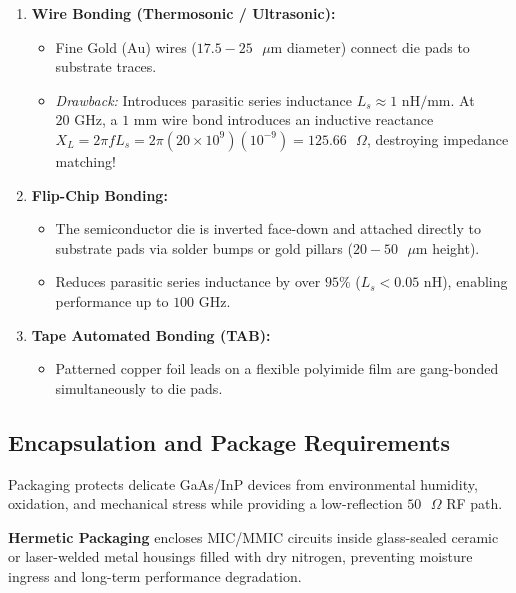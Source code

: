 \documentclass[10pt,a4paper]{article}
\begin{document}
\begin{enumerate}[leftmargin=*, itemsep=5pt]
  \item \textbf{Wire Bonding (Thermosonic / Ultrasonic):}
    \begin{itemize}[leftmargin=*, noitemsep]
      \item Fine Gold ($\text{Au}$) wires ($17.5 - 25\text{ }\mu\text{m}$ diameter) connect die pads to substrate traces.
      \item \textit{Drawback:} Introduces parasitic series inductance $L_s \approx 1\text{ nH/mm}$. At $20\text{ GHz}$, a $1\text{ mm}$ wire bond introduces an inductive reactance $X_L = 2\pi f L_s = 2\pi (20 \times 10^9) (10^{-9}) = 125.66\text{ }\Omega$, destroying impedance matching!
    \end{itemize}
  \item \textbf{Flip-Chip Bonding:}
    \begin{itemize}[leftmargin=*, noitemsep]
      \item The semiconductor die is inverted face-down and attached directly to substrate pads via solder bumps or gold pillars ($20 - 50\text{ }\mu\text{m}$ height).
      \item Reduces parasitic series inductance by over $95\%$ ($L_s < 0.05\text{ nH}$), enabling performance up to $100\text{ GHz}$.
    \end{itemize}
  \item \textbf{Tape Automated Bonding (TAB):}
    \begin{itemize}[leftmargin=*, noitemsep]
      \item Patterned copper foil leads on a flexible polyimide film are gang-bonded simultaneously to die pads.
    \end{itemize}
\end{enumerate}

\subsection{Encapsulation and Package Requirements}
Packaging protects delicate GaAs/InP devices from environmental humidity, oxidation, and mechanical stress while providing a low-reflection $50\text{ }\Omega$ RF path.

\begin{tcolorbox}[defbox, title={Hermetic Packaging}]
  \textbf{Hermetic Packaging} encloses MIC/MMIC circuits inside glass-sealed ceramic or laser-welded metal housings filled with dry nitrogen, preventing moisture ingress and long-term performance degradation.
\end{tcolorbox}
\end{document}

